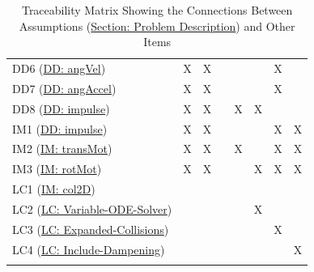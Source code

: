 \documentclass[12pt]{article}
\begin{document}
\begin{longtable}{l l l l l l l l}
\\
DD6 (\hyperref[DD:angVel]{DD: angVel}) & X & X &  &  &  & X & 
\\
DD7 (\hyperref[DD:angAccel]{DD: angAccel}) & X & X &  &  &  & X & 
\\
DD8 (\hyperref[DD:impulse]{DD: impulse}) & X & X &  & X & X &  & 
\\
IM1 (\hyperref[DD:impulse]{DD: impulse}) & X & X &  &  &  & X & X
\\
IM2 (\hyperref[IM:transMot]{IM: transMot}) & X & X &  & X &  & X & X
\\
IM3 (\hyperref[IM:rotMot]{IM: rotMot}) & X & X &  &  & X & X & X
\\
LC1 (\hyperref[IM:col2D]{IM: col2D}) &  &  &  &  &  &  & 
\\
LC2 (\hyperref[lcVODES]{LC: Variable-ODE-Solver}) &  &  &  &  & X &  & 
\\
LC3 (\hyperref[lcEC]{LC: Expanded-Collisions}) &  &  &  &  &  & X & 
\\
LC4 (\hyperref[lcID]{LC: Include-Dampening}) &  &  &  &  &  &  & X
\\
\bottomrule
\caption{Traceability Matrix Showing the Connections Between Assumptions (\hyperref[Sec:ProbDesc]{Section: Problem Description}) and Other Items}
\label{Table:TraceyAssumpsOther}
\end{longtable}
\end{document}

